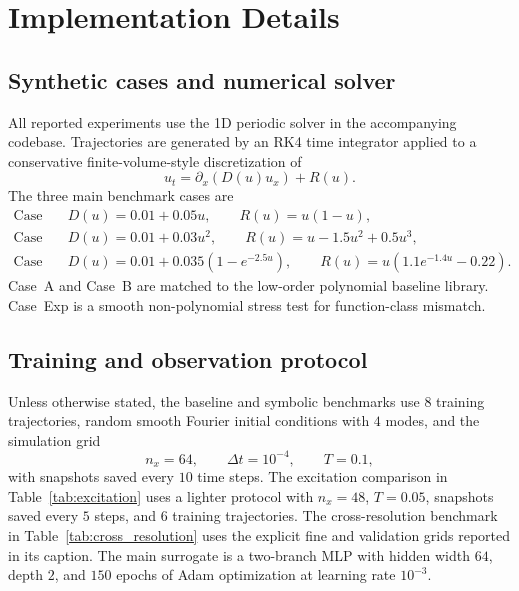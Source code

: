 \section{Implementation Details}

\subsection{Synthetic cases and numerical solver}

All reported experiments use the 1D periodic solver in the accompanying codebase. Trajectories are generated by an RK4 time integrator applied to a conservative finite-volume-style discretization of
\begin{equation}
u_t = \partial_x \left( D(u) u_x \right) + R(u).
\end{equation}
The three main benchmark cases are
\begin{align}
\text{Case A:}\quad & D(u) = 0.01 + 0.05u, \qquad R(u) = u(1-u), \\
\text{Case B:}\quad & D(u) = 0.01 + 0.03u^2, \qquad R(u) = u - 1.5u^2 + 0.5u^3, \\
\text{Case Exp:}\quad & D(u) = 0.01 + 0.035(1-e^{-2.5u}), \qquad R(u) = u(1.1e^{-1.4u} - 0.22).
\end{align}
Case~A and Case~B are matched to the low-order polynomial baseline library. Case~Exp is a smooth non-polynomial stress test for function-class mismatch.

\subsection{Training and observation protocol}

Unless otherwise stated, the baseline and symbolic benchmarks use $8$ training trajectories, random smooth Fourier initial conditions with $4$ modes, and the simulation grid
\begin{equation}
n_x = 64,\qquad \Delta t = 10^{-4},\qquad T = 0.1,
\end{equation}
with snapshots saved every $10$ time steps. The excitation comparison in Table~\ref{tab:excitation} uses a lighter protocol with $n_x=48$, $T=0.05$, snapshots saved every $5$ steps, and $6$ training trajectories. The cross-resolution benchmark in Table~\ref{tab:cross_resolution} uses the explicit fine and validation grids reported in its caption. The main surrogate is a two-branch MLP with hidden width $64$, depth $2$, and $150$ epochs of Adam optimization at learning rate $10^{-3}$.

